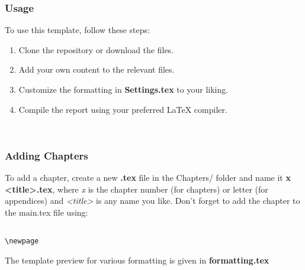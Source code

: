 \subsubsection{Usage} 
\label{subsec:use}
To use this template, follow these steps: 

\begin{enumerate}
    \item Clone the repository or download the files.
    \item Add your own content to the relevant files.
    \item Customize the formatting in \textbf{Settings.tex} to your liking.
    \item Compile the report using your preferred LaTeX compiler.
\end{enumerate} \\


\subsubsection{Adding Chapters} 
\label{subsec:chapter}
To add a chapter, create a new \textbf{.tex} file in the Chapters/ folder and name it \textbf{x <title>.tex}, where \textit{x} is the chapter number (for chapters) or letter (for appendices) and \textit{<title>} is any name you like. Don't forget to add the chapter to the main.tex file using:

\begin{lstlisting}

\newpage
\end{lstlisting}

The template preview for various formatting is given in \textbf{formatting.tex}